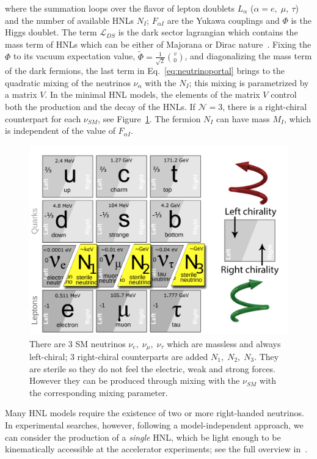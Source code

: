 where the summation loops over the flavor of lepton doublets
${L}_{\alpha}$ ($\alpha = e,\; \mu, \: \tau$) and the number of
available HNLs $N_{I}$; $F_{\alpha I} $ are the Yukawa couplings and
$\Phi$ is the Higgs doublet. The term $\mathcal{L}_{DS}$ is the dark
sector lagrangian which contains the mass term of HNLs which can be
either of Majorana or Dirac nature~\cite{Alekhin_2016}.
Fixing the $\Phi$ to its vacuum expectation value, $\widetilde \Phi = \frac{1}{\sqrt{2}} \binom{v}{0}$, and diagonalizing the mass term of the dark fermions, the last term in Eq.~\ref{eq:neutrinoportal} brings to the quadratic mixing of the neutrinos $\nu_{\alpha}$ with the $N_{I}$; this mixing is parametrized by a matrix $V$. In the minimal HNL models, the elements of the matrix $V$ control both the production and the decay of the HNLs. 
If $\mathcal{N} = 3$, there is a right-chiral counterpart for each $\nu_{SM}$, see Figure~\ref{fig:c3sm_extension}. The fermion $N_I$ can have mass $M_I$, which is independent  of the value of $F_{\alpha I}$.
\begin{figure}[t!]
  \centering
  \includegraphics[width=.60\textwidth]{Figures/c3/SM_extension}
    \caption{There are 3 SM neutrinos $\nu_{e}, \; \nu_{\mu}, \;\nu_{\tau}$ which are massless and always left-chiral; 3 right-chiral counterparts are added $N_{1}, \; N_{2}, \;N_{3}$. They are sterile so they do not feel the electric, weak and strong forces. However they can be produced through mixing with the $\nu_{SM}$ with the corresponding mixing parameter.}
  \label{fig:c3sm_extension}
\end{figure}

Many HNL models require the existence of two or more right-handed neutrinos. In experimental searches, however, following a model-independent approach, we can consider the production of a \emph{single} HNL, which be light enough to be kinematically accessible at the accelerator experiments; see the full overview in~\cite{Atre_2009}. 


